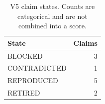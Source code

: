 \begin{table}[t]
\centering
\caption{V5 claim states. Counts are categorical and are not combined into a score.}
\begin{tabular}{lr}
\toprule
State & Claims \\
\midrule
BLOCKED & 3 \\
CONTRADICTED & 1 \\
REPRODUCED & 5 \\
RETIRED & 2 \\
\bottomrule
\end{tabular}
\end{table}
